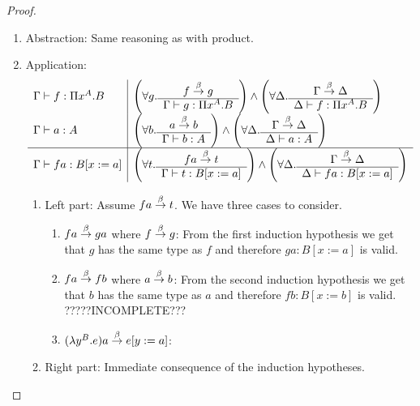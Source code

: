 \begin{theorem}
{\begin{proof}
\begin{enumerate}
\begin{enumerate}
                \item Abstraction: Same reasoning as with product.

                \item Application:
                $$
                \begin{array}{l|l}
                    \Gamma \vdash f: \Pi x^A. B
                    &
                    \left( \forall g. \begin{array}{c} f \stackrel{\beta}{\to} g \\ \hline \Gamma \vdash g: \Pi x^A. B\end{array} \right)
                    \land
                    \left( \forall \Delta. \begin{array}{c} \Gamma \stackrel{\beta}{\to} \Delta \\ \hline \Delta \vdash f: \Pi x^A.B\end{array} \right)
                    \\
                    \Gamma \vdash a: A
                    &
                    \left( \forall b. \begin{array}{c} a \stackrel{\beta}{\to} b \\ \hline \Gamma \vdash b: A\end{array} \right)
                    \land
                    \left( \forall \Delta. \begin{array}{c} \Gamma \stackrel{\beta}{\to} \Delta \\ \hline \Delta \vdash a: A\end{array} \right)
                    \\
                    \hline
                    \Gamma \vdash f a: B[x:=a]
                    &
                    \left( \forall t. \begin{array}{c} f a \stackrel{\beta}{\to} t \\ \hline \Gamma \vdash t: B[x:=a]\end{array} \right)
                    \land
                    \left( \forall \Delta. \begin{array}{c} \Gamma \stackrel{\beta}{\to} \Delta \\ \hline \Delta \vdash f a: B[x:=a]\end{array} \right)
                \end{array}
                $$
                \begin{enumerate}
                    \item Left part: Assume $f a \stackrel{\beta}{\to} t$. We have three cases
                        to consider.
                    \begin{enumerate}
                        \item $f a \stackrel{\beta}{\to} g a$ where $f \stackrel{\beta}{\to} g$: From the
                            first induction hypothesis we get that $g$ has the
                            same type as $f$ and therefore $g a: B[x:=a]$ is
                            valid.

                        \item $f a \stackrel{\beta}{\to} f b$ where $a \stackrel{\beta}{\to} b$:
                            From the second induction hypothesis we get that $b$
                            has the same type as $a$ and therefore $f b:
                            B[x:=b]$ is valid. ?????INCOMPLETE???

                        \item $(\lambda y^B. e) a \stackrel{\beta}{\to} e[y:=a]$:

                    \end{enumerate}

                    \item Right part: Immediate consequence of the induction
                        hypotheses.
                \end{enumerate}
            \end{enumerate}


\end{enumerate}
\end{proof}}
\end{theorem}
